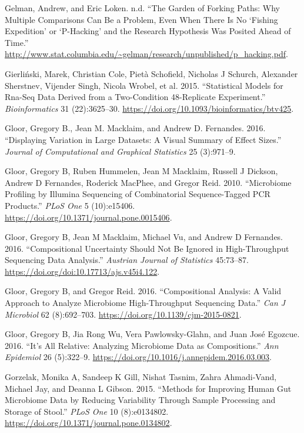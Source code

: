 \documentclass[onecolumn]{book}
\theoremstyle{definition}
\theoremstyle{definition}
\theoremstyle{definition}
\theoremstyle{remark}
\begin{document}
\leavevmode\hypertarget{ref-forking:2013}{}%
Gelman, Andrew, and Eric Loken. n.d. ``The Garden of Forking Paths: Why
Multiple Comparisons Can Be a Problem, Even When There Is No `Fishing
Expedition' or `P-Hacking' and the Research Hypothesis Was Posited Ahead
of Time.''
\url{http://www.stat.columbia.edu/~gelman/research/unpublished/p_hacking.pdf}.

\leavevmode\hypertarget{ref-Gierlinski:2015aa}{}%
Gierliński, Marek, Christian Cole, Pietà Schofield, Nicholas J Schurch,
Alexander Sherstnev, Vijender Singh, Nicola Wrobel, et al. 2015.
``Statistical Models for Rna-Seq Data Derived from a Two-Condition
48-Replicate Experiment.'' \emph{Bioinformatics} 31 (22):3625--30.
\url{https://doi.org/10.1093/bioinformatics/btv425}.

\leavevmode\hypertarget{ref-Gloor:2015}{}%
Gloor, Gregory B., Jean M. Macklaim, and Andrew D. Fernandes. 2016.
``Displaying Variation in Large Datasets: A Visual Summary of Effect
Sizes.'' \emph{Journal of Computational and Graphical Statistics} 25
(3):971--9.

\leavevmode\hypertarget{ref-Gloor:2010}{}%
Gloor, Gregory B, Ruben Hummelen, Jean M Macklaim, Russell J Dickson,
Andrew D Fernandes, Roderick MacPhee, and Gregor Reid. 2010.
``Microbiome Profiling by Illumina Sequencing of Combinatorial
Sequence-Tagged PCR Products.'' \emph{PLoS One} 5 (10):e15406.
\url{https://doi.org/10.1371/journal.pone.0015406}.

\leavevmode\hypertarget{ref-gloorAJS:2016}{}%
Gloor, Gregory B, Jean M Macklaim, Michael Vu, and Andrew D Fernandes.
2016. ``Compositional Uncertainty Should Not Be Ignored in
High-Throughput Sequencing Data Analysis.'' \emph{Austrian Journal of
Statistics} 45:73--87. \url{https://doi.org/doi:10.17713/ajs.v45i4.122}.

\leavevmode\hypertarget{ref-Gloor:2016cjm}{}%
Gloor, Gregory B, and Gregor Reid. 2016. ``Compositional Analysis: A
Valid Approach to Analyze Microbiome High-Throughput Sequencing Data.''
\emph{Can J Microbiol} 62 (8):692--703.
\url{https://doi.org/10.1139/cjm-2015-0821}.

\leavevmode\hypertarget{ref-gloor2016s}{}%
Gloor, Gregory B, Jia Rong Wu, Vera Pawlowsky-Glahn, and Juan José
Egozcue. 2016. ``It's All Relative: Analyzing Microbiome Data as
Compositions.'' \emph{Ann Epidemiol} 26 (5):322--9.
\url{https://doi.org/10.1016/j.annepidem.2016.03.003}.

\leavevmode\hypertarget{ref-Gorzelak:2015aa}{}%
Gorzelak, Monika A, Sandeep K Gill, Nishat Tasnim, Zahra Ahmadi-Vand,
Michael Jay, and Deanna L Gibson. 2015. ``Methods for Improving Human
Gut Microbiome Data by Reducing Variability Through Sample Processing
and Storage of Stool.'' \emph{PLoS One} 10 (8):e0134802.
\url{https://doi.org/10.1371/journal.pone.0134802}.
\end{document}
